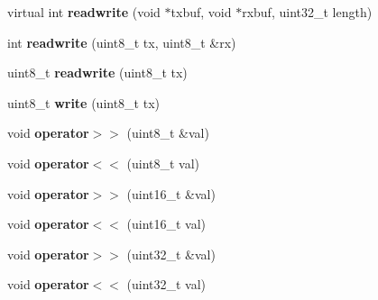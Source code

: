 \begin{DoxyCompactItemize}
\item 
\hypertarget{class_c_s_p_i_a5215a320db4cb5f2792ea18f8d6e0671}{virtual int {\bfseries readwrite} (void $\ast$txbuf, void $\ast$rxbuf, uint32\-\_\-t length)}\label{class_c_s_p_i_a5215a320db4cb5f2792ea18f8d6e0671}

\item 
\hypertarget{class_c_s_p_i_a0cdfe6a4d42e835cf7b67ba99ae115ca}{int {\bfseries readwrite} (uint8\-\_\-t tx, uint8\-\_\-t \&rx)}\label{class_c_s_p_i_a0cdfe6a4d42e835cf7b67ba99ae115ca}

\item 
\hypertarget{class_c_s_p_i_acf2e1695f717fa88620e4bddd7871ea3}{uint8\-\_\-t {\bfseries readwrite} (uint8\-\_\-t tx)}\label{class_c_s_p_i_acf2e1695f717fa88620e4bddd7871ea3}

\item 
\hypertarget{class_c_s_p_i_a2b91318925ae9de3f295abd2418285c4}{uint8\-\_\-t {\bfseries write} (uint8\-\_\-t tx)}\label{class_c_s_p_i_a2b91318925ae9de3f295abd2418285c4}

\item 
\hypertarget{class_c_s_p_i_a24ca202a0494b84a92ff56d10725ce40}{void {\bfseries operator$>$$>$} (uint8\-\_\-t \&val)}\label{class_c_s_p_i_a24ca202a0494b84a92ff56d10725ce40}

\item 
\hypertarget{class_c_s_p_i_a3ce438bee4e3c087e44b3cf2b1690ecd}{void {\bfseries operator$<$$<$} (uint8\-\_\-t val)}\label{class_c_s_p_i_a3ce438bee4e3c087e44b3cf2b1690ecd}

\item 
\hypertarget{class_c_s_p_i_ac53ab106be8d0f369b349f82b3db6813}{void {\bfseries operator$>$$>$} (uint16\-\_\-t \&val)}\label{class_c_s_p_i_ac53ab106be8d0f369b349f82b3db6813}

\item 
\hypertarget{class_c_s_p_i_a272f5e518d21194dbc996f5f5475ae02}{void {\bfseries operator$<$$<$} (uint16\-\_\-t val)}\label{class_c_s_p_i_a272f5e518d21194dbc996f5f5475ae02}

\item 
\hypertarget{class_c_s_p_i_aaf1a92290aaee5a93f8fc2db9ce4a512}{void {\bfseries operator$>$$>$} (uint32\-\_\-t \&val)}\label{class_c_s_p_i_aaf1a92290aaee5a93f8fc2db9ce4a512}

\item 
\hypertarget{class_c_s_p_i_a4d0cd48d0bba271fd72df43d7528e2a0}{void {\bfseries operator$<$$<$} (uint32\-\_\-t val)}\label{class_c_s_p_i_a4d0cd48d0bba271fd72df43d7528e2a0}

\end{DoxyCompactItemize}
